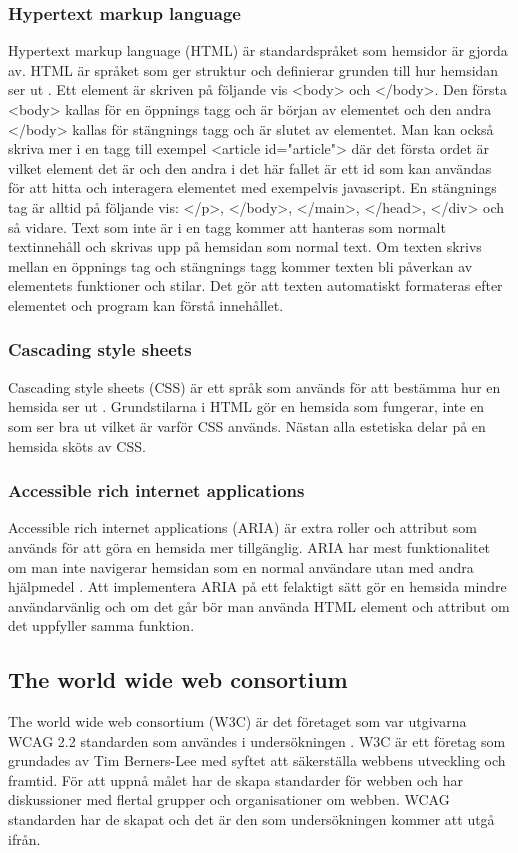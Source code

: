 \documentclass[11p]{article}
\begin{document}
    \subsubsection{Hypertext markup language}
    Hypertext markup language (HTML) är standardspråket som hemsidor är gjorda av.
    HTML är språket som ger struktur och definierar grunden till hur hemsidan ser ut \parencite{HTML}.
    Ett element är skriven på följande vis <body> och </body>.
    Den första <body> kallas för en öppnings tagg och är början av elementet och den andra </body> kallas för stängnings tagg och är slutet av elementet.
    Man kan också skriva mer i en tagg till exempel <article id="article"> där det första ordet är vilket element det är och den andra i det här fallet är ett id som kan användas för att hitta och interagera elementet med exempelvis javascript.
    En stängnings tag är alltid på följande vis: </p>, </body>, </main>, </head>, </div> och så vidare.
    Text som inte är i en tagg kommer att hanteras som normalt textinnehåll och skrivas upp på hemsidan som normal text.
    Om texten skrivs mellan en öppnings tag och stängnings tagg kommer texten bli påverkan av elementets funktioner och stilar.
    Det gör att texten automatiskt formateras efter elementet och program kan förstå innehållet.

    \subsubsection{Cascading style sheets}
    Cascading style sheets (CSS) är ett språk som används för att bestämma hur en hemsida ser ut \parencite{CSS}.
    Grundstilarna i HTML gör en hemsida som fungerar, inte en som ser bra ut vilket är varför CSS används.
    Nästan alla estetiska delar på en hemsida sköts av CSS.

    \subsubsection{Accessible rich internet applications}
    Accessible rich internet applications (ARIA) är extra roller och attribut som används för att göra en hemsida mer tillgänglig.
    ARIA har mest funktionalitet om man inte navigerar hemsidan som en normal användare utan med andra hjälpmedel \parencite{ARIA}.
    Att implementera ARIA på ett felaktigt sätt gör en hemsida mindre användarvänlig och om det går bör man använda HTML element och attribut om det uppfyller samma funktion.
    
    \subsection{The world wide web consortium}
    The world wide web consortium (W3C) är det företaget som var utgivarna WCAG 2.2 standarden som användes i undersökningen \parencite{W3C}.
    W3C är ett företag som grundades av Tim Berners-Lee med syftet att säkerställa webbens utveckling och framtid.
    För att uppnå målet har de skapa standarder för webben och har diskussioner med flertal grupper och organisationer om webben.
    WCAG standarden har de skapat och det är den som undersökningen kommer att utgå ifrån.
\end{document}
